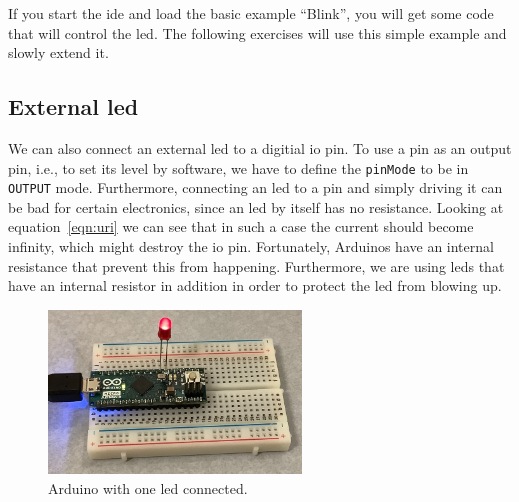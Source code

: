 If you start the \ac{ide} and load the basic example ``Blink'', you will get some code that will control the \ac{led}. The following exercises will use this simple example and slowly extend it.


\subsection{External \acs{led}}

We can also connect an external \ac{led} to a digitial \ac{io} pin. To use a pin as an output pin, i.e., to set its level by software, we have to define the \lstinline{pinMode} to be in \lstinline{OUTPUT} mode. Furthermore, connecting an \ac{led} to a pin and simply driving it can be bad for certain electronics, since an \ac{led} by itself has no resistance. Looking at equation~\eqref{eqn:uri} we can see that in such a case the current should become infinity, which might destroy the \ac{io} pin. Fortunately, Arduinos have an internal resistance that prevent this from happening. Furthermore, we are using \acp{led} that have an internal resistor in addition in order to protect the \ac{led} from blowing up.

\begin{figure}[htb]
    \centering
    \includegraphics[width=0.6\textwidth]{graphics/01_blink/arduino_led.jpg}
    \caption{Arduino with one \ac{led} connected.}
    \label{fig:blink:arduino_led}
\end{figure}

